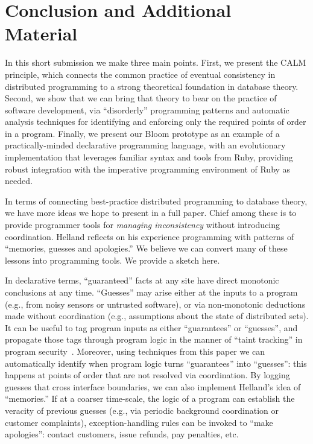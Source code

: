 \section{Conclusion and Additional Material}
\label{sec:conclusion}
In this short submission we make three main points.  First, we present the CALM principle, which connects the common practice of eventual consistency in distributed programming to a strong theoretical foundation in database theory.  Second, we show that we can bring that theory to bear on the practice of software development, via ``disorderly'' programming patterns and automatic analysis techniques for  identifying and enforcing only the required points of order in a program. Finally, we present our Bloom prototype as an example of a practically-minded declarative programming language, with an evolutionary implementation that leverages familiar syntax and tools from Ruby, providing robust integration with the imperative programming environment of Ruby as needed.

In terms of connecting best-practice distributed programming to database theory, we have more ideas we hope to present in a full paper.  Chief among these is to provide programmer tools for \emph{managing inconsistency} without introducing coordination.  Helland reflects on his experience programming with patterns of ``memories, guesses and apologies.''  We believe we can convert many of these lessons into programming tools.  We provide a sketch here.

In declarative terms, ``guaranteed'' facts at any site have direct monotonic conclusions at any time.  ``Guesses'' may arise either at the inputs to a program (e.g., from noisy sensors or untrusted software), or via non-monotonic deductions made without coordination (e.g., assumptions about the state of distributed sets).  It can be useful to tag program inputs as either ``guarantees'' or ``guesses'', and propagate those tags through program logic in the manner of ``taint tracking'' in program security~\cite{taint}.  Moreover, using techniques from this paper we can automatically identify when program logic turns ``guarantees'' into ``guesses'': this happens at points of order that are not resolved via coordination.    
By logging guesses that cross interface boundaries, we can also implement Helland's idea of ``memories.''  If at a coarser time-scale, the logic of a program can establish the veracity of previous guesses (e.g., via periodic background coordination or customer complaints), exception-handling rules can be invoked to ``make apologies'': contact customers, issue refunds, pay penalties, etc.

